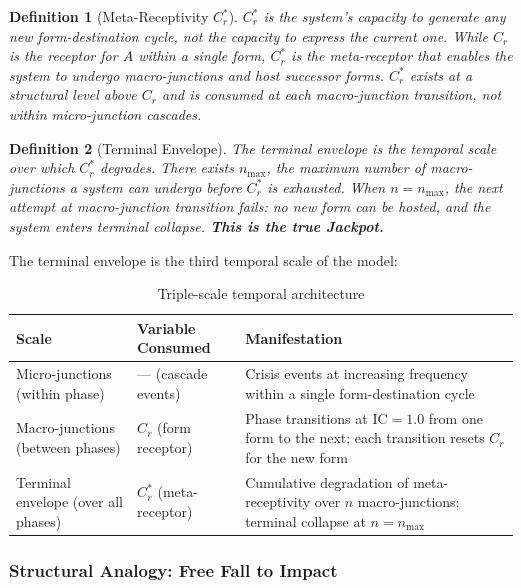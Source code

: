 \documentclass[12pt,a4paper]{article}
\newtheorem{definition}{Definition}[section]
\newcommand{\reag}{C_r}
\newcommand{\reagmeta}{C_r^{*}}
\newcommand{\IC}{\mathrm{IC}}
\newcommand{\Mpot}{A}
\newcommand{\nmax}{n_{\mathrm{max}}}
\begin{document}
\begin{definition}[Meta-Receptivity $\reagmeta$]\label{def:cmeta}
$\reagmeta$ is the system's capacity to generate \emph{any} new form-destination cycle, not the capacity to express the current one. While $\reag$ is the receptor for $\Mpot$ within a single form, $\reagmeta$ is the meta-receptor that enables the system to undergo macro-junctions and host successor forms. $\reagmeta$ exists at a structural level above $\reag$ and is consumed at each macro-junction transition, not within micro-junction cascades.
\end{definition}

\begin{definition}[Terminal Envelope]\label{def:terminal}
The terminal envelope is the temporal scale over which $\reagmeta$ degrades. There exists $\nmax$, the maximum number of macro-junctions a system can undergo before $\reagmeta$ is exhausted. When $n = \nmax$, the next attempt at macro-junction transition fails: no new form can be hosted, and the system enters terminal collapse. \textbf{This is the true Jackpot.}
\end{definition}

The terminal envelope is the third temporal scale of the model:

\begin{table}[H]
\centering
\caption{Triple-scale temporal architecture}
\label{tab:triple_scale}
\begin{tabular}{@{}p{2.5cm}p{4cm}p{6cm}@{}}
\toprule
\textbf{Scale} & \textbf{Variable Consumed} & \textbf{Manifestation} \\
\midrule
Micro-junctions (within phase) & --- (cascade events) & Crisis events at increasing frequency within a single form-destination cycle \\[0.4em]
Macro-junctions (between phases) & $\reag$ (form receptor) & Phase transitions at $\IC = 1.0$ from one form to the next; each transition resets $\reag$ for the new form \\[0.4em]
Terminal envelope (over all phases) & $\reagmeta$ (meta-receptor) & Cumulative degradation of meta-receptivity over $n$ macro-junctions; terminal collapse at $n = \nmax$ \\
\bottomrule
\end{tabular}
\end{table}

\subsubsection{Structural Analogy: Free Fall to Impact}
\end{document}
